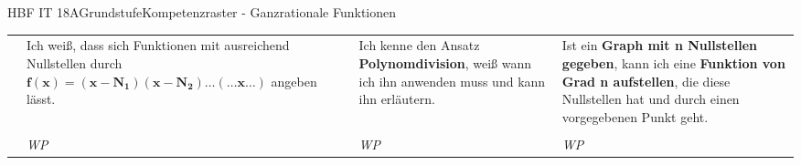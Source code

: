 \documentclass[oneside,openany,headings=optiontotoc,12pt,numbers=noenddot]{scrreprt}
\begin{document}
\begin{worksheet}{HBF IT 18A}{Grundstufe}{Kompetenzraster - Ganzrationale Funktionen}
\begin{tabularx}{\textwidth}{|L{2.5cm}|X|X|X|}
			& Ich weiß, dass sich Funktionen mit ausreichend Nullstellen durch \(\mathbf{f(x) = (x-N_1)(x-N_2)\ldots(\ldots{}x\ldots)}\) angeben lässt. & Ich kenne den Ansatz \textbf{Polynomdivision}, weiß wann ich ihn anwenden muss und kann ihn erläutern. & Ist ein \textbf{Graph mit n Nullstellen gegeben}, kann ich eine \textbf{Funktion von Grad n aufstellen}, die diese Nullstellen hat und durch einen vorgegebenen Punkt geht.\\
			& & & \\
			& \textit{WP } & \textit{WP } & \textit{WP } \\
			\hline
		\end{tabularx}
	\end{worksheet}
\end{document}
